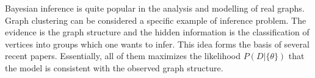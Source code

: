 \documentclass[letterpaper]{article}
\begin{document}
Bayesian inference is quite popular in the analysis and modelling of real
graphs. Graph clustering can be considered a specific example of inference
problem. The evidence is the graph structure and the hidden information is the
classification of vertices into groups which one wants to infer. This idea
forms the basis of several recent papers. Essentially, all of them maximizes
the likelihood $P(D|\{\theta\})$ that the model is consistent with the observed
graph structure. 

 
\end{document}
